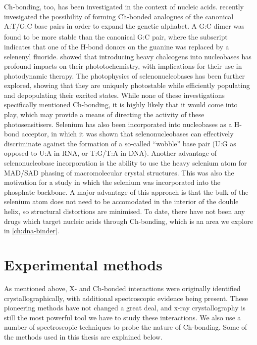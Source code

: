 \begin{refsection}
Ch-bonding, too, has been investigated in the context of nucleic acids.
 recently invesigated the possibility of forming Ch-bonded analogues of the canonical A:T/G:C base pairs in order to expand the genetic alphabet.\autocite{Sharma2020}
A G\textsubscript{}:C dimer was found to be more stable than the canonical G:C pair, where the  subscript indicates that one of the H-bond donors on the guanine was replaced by a selenenyl fluoride.
 showed that introducing heavy chalcogens into nucleobases has profound impacts on their phototochemistry, with implications for their use in photodynamic therapy.\autocite{Farrell2018}
The photophysics of selenonucleobases has been further explored, showing that they are uniquely photostable while efficiently populating and depopulating their excited states.\autocite{Mai2019,Peng2020,Fang2019,Uleany2020}
While none of these investigations specifically mentioned Ch-bonding, it is highly likely that it would come into play, which may provide a means of directing the activity of these photosensitisers.
Selenium has also been incorporated into nucleobases as a H-bond acceptor, in which it was shown that selenonucleobases can effectively discriminate against the formation of a so-called ``wobble'' base pair (U:G as opposed to U:A in RNA, or T:G/T:A in DNA).\autocite{Hassan2010,Sun2012}
Another advantage of selenonucleobase incorporation is the ability to use the heavy selenium atom for MAD/SAD phasing of macromolecular crystal structures.\autocite{Salon2007}
This was also the motivation for a \citeyear{Conlon2019} study in which the selenium was incorporated into the phosphate backbone.\autocite{Conlon2019}
A major advantage of this approach is that the bulk of the selenium atom does not need to be accomodated in the interior of the double helix, so structural distortions are minimised.
To date, there have not been any drugs which target nucleic acids through Ch-bonding, which is an area we explore in \cref{ch:dna-binder}.

\section{Experimental methods}
As mentioned above, X- and Ch-bonded interactions were originally identified crystallographically, with additional spectroscopic evidence being present.
These pioneering methods have not changed a great deal, and x-ray crystallography is still the most powerful tool we have to study these interactions.
We also use a number of spectroscopic techniques to probe the nature of Ch-bonding.
Some of the methods used in this thesis are explained below.


\end{refsection}
